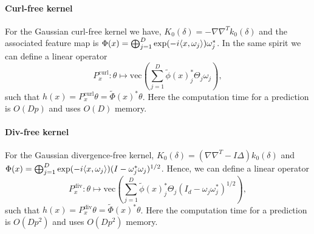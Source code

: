 \documentclass{article}
\begin{document}
\paragraph{Curl-free kernel}
For the Gaussian curl-free kernel we have, $K_0(\delta)=-\nabla\nabla^Tk_0(\delta)$ and the associated feature map is $\Phi(x)=\operatorname*{\bigoplus}_{j=1}^D\exp(-i\langle x,\omega_j\rangle)\omega_j^*$. In the same spirit we can define a linear operator
\begin{equation*}
    P^\text{curl}_x:\theta\mapsto \text{vec}\left(\sum_{j=1}^D\tilde{\phi}(x)_j^*\Theta_j \omega_j\right),
\end{equation*}
such that $h(x)=P^\text{curl}_x \theta=\tilde{\Phi}(x)^*\theta$. Here the computation time for a prediction is $O(Dp)$ and uses $O(D)$ memory.

\paragraph{Div-free kernel}
For the Gaussian divergence-free kernel, $K_0(\delta)=(\nabla\nabla^T-I\Delta)k_0(\delta)$ and $\Phi(x)=\operatorname*{\bigoplus}_{j=1}^D\exp(-i\langle x,\omega_j\rangle)(I-\omega_j^*\omega_j)^{1/2}$. Hence, we can define a linear operator
\begin{equation*}
    P^\text{div}_x:\theta\mapsto \text{vec}\left(\sum_{j=1}^D\tilde{\phi}(x)_j^*\Theta_j (I_d-\omega_j\omega_j^*)^{1/2}\right),
\end{equation*}
such that $h(x)=P^\text{div}_x \theta=\tilde{\Phi}(x)^*\theta$. Here the computation time for a prediction is $O(Dp^2)$ and uses $O(Dp^2)$ memory.

\end{document}
